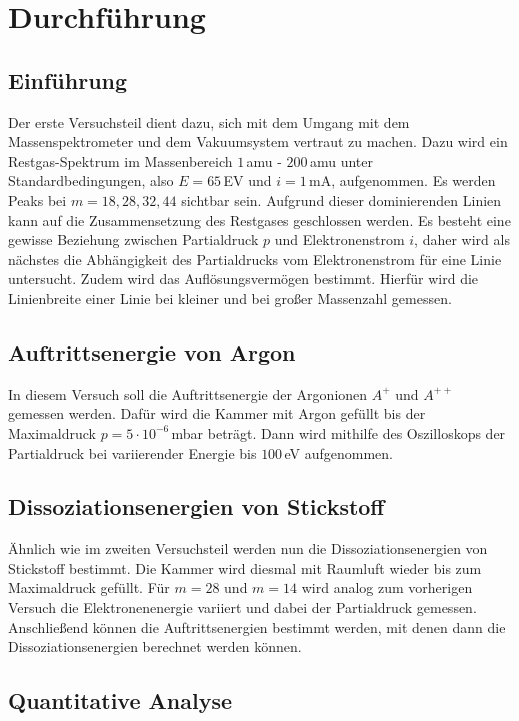 \chapter{Durchführung}
\section{Einführung}
Der erste Versuchsteil dient dazu, sich mit dem Umgang mit dem Massenspektrometer und dem Vakuumsystem vertraut zu machen. Dazu wird ein Restgas-Spektrum im Massenbereich $1\,$amu - $200\,$amu unter Standardbedingungen, also $E=65\,$EV und $i=1\,$mA, aufgenommen. Es werden Peaks bei $m=18, 28, 32, 44$ sichtbar sein. Aufgrund dieser dominierenden Linien kann auf die Zusammensetzung des Restgases geschlossen werden. Es besteht eine gewisse Beziehung zwischen Partialdruck $p$ und Elektronenstrom $i$, daher wird als nächstes die Abhängigkeit des Partialdrucks vom Elektronenstrom für eine Linie untersucht. Zudem wird das Auflösungsvermögen  bestimmt. Hierfür wird die Linienbreite einer Linie bei kleiner und bei großer Massenzahl gemessen. 

\section{Auftrittsenergie von Argon}
In diesem Versuch soll die Auftrittsenergie der Argonionen $A^{+}$ und $A^{++}$ gemessen werden. Dafür wird die Kammer mit Argon gefüllt bis der Maximaldruck $p=5 \cdot 10^{-6}\,$mbar beträgt. Dann wird mithilfe des Oszilloskops der Partialdruck bei variierender Energie bis $100\,$eV aufgenommen.

\section{Dissoziationsenergien von Stickstoff}
Ähnlich wie im zweiten Versuchsteil werden nun die Dissoziationsenergien von Stickstoff bestimmt. Die Kammer wird diesmal mit Raumluft wieder bis zum Maximaldruck gefüllt. Für $m=28$ und $m=14$ wird analog zum vorherigen Versuch die Elektronenenergie variiert und dabei der Partialdruck gemessen. Anschließend können die Auftrittsenergien bestimmt werden, mit denen dann die Dissoziationsenergien berechnet werden können.

\section{Quantitative Analyse}
